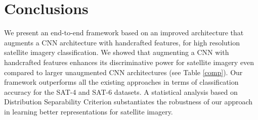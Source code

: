 \documentclass[]{interact}
\theoremstyle{plain}\newtheorem{theorem}{Theorem}[section]
\theoremstyle{definition}
\theoremstyle{remark}
\begin{document}
\section{Conclusions}
We present an end-to-end framework based on an improved architecture that  augments a  CNN architecture with handcrafted features, for high resolution satellite imagery classification. We showed that augmenting a CNN with  handcrafted features  enhances its discriminative power  for satellite imagery even compared to larger unaugmented CNN architectures \citep{zhong2017satcnn} (see Table \ref{comp}). Our framework outperforms all the existing approaches \citep{basu2015,simo2015discriminative,zhong2017satcnn,ma2016satellite,gong2018diversity, liu2018scene} in terms of classification accuracy for the SAT-4 and SAT-6 datasets. A statistical analysis based on Distribution Separability Criterion  substantiates the robustness of our approach in learning better representations for satellite imagery. 







\end{document}
